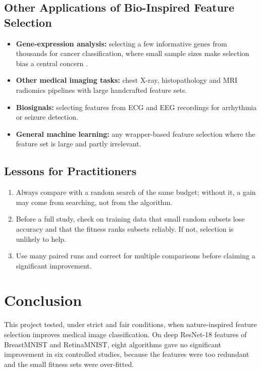 \documentclass[12pt,a4paper]{report}
\begin{document}
\section{Other Applications of Bio-Inspired Feature Selection}
\begin{itemize}
  \item \textbf{Gene-expression analysis:} selecting a few informative genes from thousands for cancer
        classification, where small sample sizes make selection bias a central concern \cite{ambroise2002}.
  \item \textbf{Other medical imaging tasks:} chest X-ray, histopathology and MRI radiomics pipelines with large
        handcrafted feature sets.
  \item \textbf{Biosignals:} selecting features from ECG and EEG recordings for arrhythmia or seizure detection.
  \item \textbf{General machine learning:} any wrapper-based feature selection where the feature set is large and
        partly irrelevant.
\end{itemize}

\section{Lessons for Practitioners}
\begin{enumerate}
  \item Always compare with a random search of the same budget; without it, a gain may come from searching, not
        from the algorithm.
  \item Before a full study, check on training data that small random subsets lose accuracy and that the fitness
        ranks subsets reliably. If not, selection is unlikely to help.
  \item Use many paired runs and correct for multiple comparisons before claiming a significant improvement.
\end{enumerate}

\chapter{Conclusion}
This project tested, under strict and fair conditions, when nature-inspired feature selection improves medical image
classification. On deep ResNet-18 features of BreastMNIST and RetinaMNIST, eight algorithms gave no significant
improvement in six controlled studies, because the features were too redundant and the small fitness sets were
over-fitted.
\end{document}
